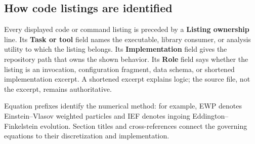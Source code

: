 \subsection{How code listings are identified}

Every displayed code or command listing is preceded by a \textbf{Listing
ownership} line.  Its \textbf{Task or tool} field names the executable,
library consumer, or analysis utility to which the listing belongs.  Its
\textbf{Implementation} field gives the repository path that owns the shown
behavior.  Its \textbf{Role} field says whether the listing is an invocation,
configuration fragment, data schema, or shortened implementation excerpt.
A shortened excerpt explains logic; the source file, not the excerpt, remains
authoritative.

Equation prefixes identify the numerical method: for example, EWP denotes
Einstein--Vlasov weighted particles and IEF denotes ingoing
Eddington--Finkelstein evolution. Section titles and cross-references connect
the governing equations to their discretization and implementation.
